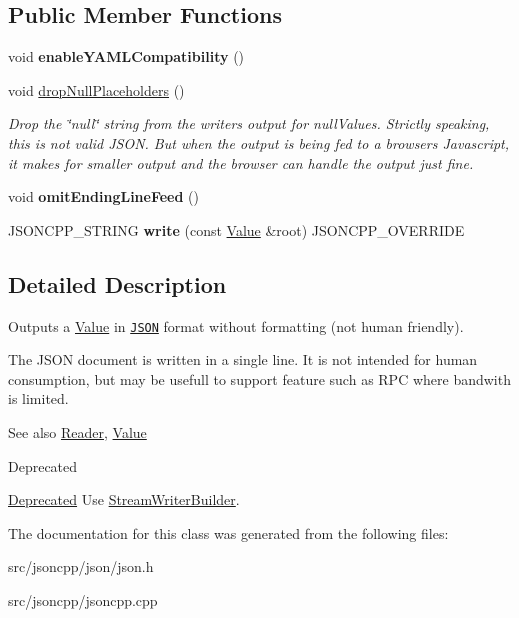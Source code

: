 \subsection*{Public Member Functions}
\begin{DoxyCompactItemize}
\item 
void {\bfseries enable\+Y\+A\+M\+L\+Compatibility} ()\hypertarget{classJson_1_1FastWriter_a78d98e9f76d33660ad6e6a1abe287d45}{}\label{classJson_1_1FastWriter_a78d98e9f76d33660ad6e6a1abe287d45}

\item 
void \hyperlink{classJson_1_1FastWriter_a6e93d8dce951e408517311026a065b40}{drop\+Null\+Placeholders} ()\hypertarget{classJson_1_1FastWriter_a6e93d8dce951e408517311026a065b40}{}\label{classJson_1_1FastWriter_a6e93d8dce951e408517311026a065b40}

\begin{DoxyCompactList}\small\item\em Drop the \char`\"{}null\char`\"{} string from the writer\textquotesingle{}s output for null\+Values. Strictly speaking, this is not valid J\+S\+ON. But when the output is being fed to a browser\textquotesingle{}s Javascript, it makes for smaller output and the browser can handle the output just fine. \end{DoxyCompactList}\item 
void {\bfseries omit\+Ending\+Line\+Feed} ()\hypertarget{classJson_1_1FastWriter_af4ee077d365d75941fb2688d97207a55}{}\label{classJson_1_1FastWriter_af4ee077d365d75941fb2688d97207a55}

\item 
J\+S\+O\+N\+C\+P\+P\+\_\+\+S\+T\+R\+I\+NG {\bfseries write} (const \hyperlink{classJson_1_1Value}{Value} \&root) J\+S\+O\+N\+C\+P\+P\+\_\+\+O\+V\+E\+R\+R\+I\+DE\hypertarget{classJson_1_1FastWriter_a93d45ba4bc312371d08beb3e3dfbe654}{}\label{classJson_1_1FastWriter_a93d45ba4bc312371d08beb3e3dfbe654}

\end{DoxyCompactItemize}


\subsection{Detailed Description}
Outputs a \hyperlink{classJson_1_1Value}{Value} in \href{http://www.json.org}{\tt J\+S\+ON} format without formatting (not human friendly). 

The J\+S\+ON document is written in a single line. It is not intended for \textquotesingle{}human\textquotesingle{} consumption, but may be usefull to support feature such as R\+PC where bandwith is limited. \begin{DoxySeeAlso}{See also}
\hyperlink{classJson_1_1Reader}{Reader}, \hyperlink{classJson_1_1Value}{Value} 
\end{DoxySeeAlso}
\begin{DoxyRefDesc}{Deprecated}
\item[\hyperlink{deprecated__deprecated000008}{Deprecated}]Use \hyperlink{classJson_1_1StreamWriterBuilder}{Stream\+Writer\+Builder}. \end{DoxyRefDesc}


The documentation for this class was generated from the following files\+:\begin{DoxyCompactItemize}
\item 
src/jsoncpp/json/json.\+h\item 
src/jsoncpp/jsoncpp.\+cpp\end{DoxyCompactItemize}

